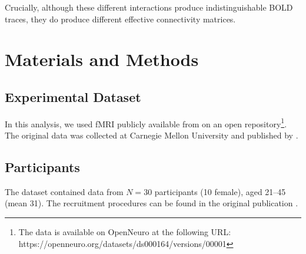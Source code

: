 \documentclass[10pt,letterpaper]{article}
\begin{document}
Crucially, although these different interactions produce indistinguishable BOLD traces, they do produce different effective connectivity matrices.


\section{Materials and Methods}

\subsection{Experimental Dataset}

In this analysis, we used fMRI publicly available from on an open repository\footnote{The data is available on OpenNeuro at the following URL:  https://openneuro.org/datasets/ds000164/versions/00001}. The original data was collected at Carnegie Mellon University and published by .

\subsection{Participants}

The dataset contained data from $N=30$ participants (10 female), aged 21--45 (mean 31). The recruitment  procedures can be found in the original publication \cite{Verstynen2014}.
\end{document}
